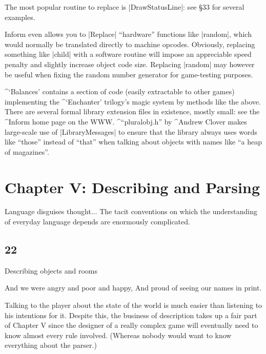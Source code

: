 The most popular routine to replace is |DrawStatusLine|: see \S 33 for
several examples.

\ddanger
Inform even allows you to |Replace| ``hardware'' functions like |random|,
which would normally be translated directly to machine opcodes.  Obviously,
replacing something like |child| with a software routine will impose an
appreciable speed penalty and slightly increase object code size.  Replacing
|random| may however be useful when fixing the random number generator for
game-testing purposes.

\tenpoint

^{`Balances'} contains a section of code (easily extractable to
other games) implementing the ^{`Enchanter' trilogy}'s magic
system by methods like the above.
\nextref
There are several formal library extension files in existence,
mostly small: see the ^{Inform home page} on the WWW.
\nextref ^{``pluralobj.h''}
by ^{Andrew Clover} makes large-scale use of |LibraryMessages|
to ensure that the library always uses words like ``those''
instead of ``that'' when talking about objects with names like
``a heap of magazines''.

\chapter{Chapter V: Describing and Parsing}

\vskip 0.5in
\quote
Language disguises thought$\ldots$ The tacit conventions on which
the understanding of everyday language depends are enormously
complicated.

\section{22}{Describing objects and rooms}

\poem
And we were angry and poor and happy,
And proud of seeing our names in print.

\noindent
Talking to the player about the state of the world is much easier
than listening to his intentions for it.  Despite this, the business of
description takes up a fair part of Chapter V since the
designer of a really complex game will eventually need to know almost
every rule involved.  (Whereas nobody would want to know everything
about the parser.)

